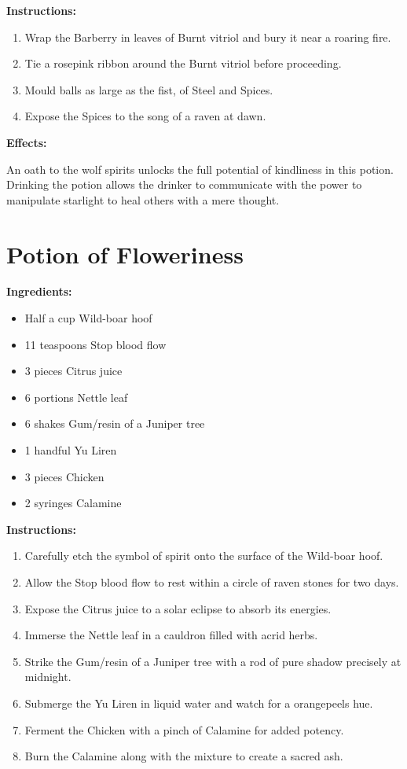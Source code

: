 \documentclass{article}
\begin{document}
\textbf{Instructions:}

\begin{enumerate}
  \item Wrap the Barberry in leaves of Burnt vitriol and bury it near a roaring fire.
  \item Tie a rosepink ribbon around the Burnt vitriol before proceeding.
  \item Mould balls as large as the fist, of Steel and Spices.
  \item Expose the Spices to the song of a raven at dawn.
\end{enumerate}

\textbf{Effects:}

An oath to the wolf spirits unlocks the full potential of kindliness in this potion. Drinking the potion allows the drinker to communicate with the power to manipulate starlight to heal others with a mere thought.

\newpage
\section*{Potion of Floweriness}

\textbf{Ingredients:}

\begin{itemize}
  \item Half a cup Wild-boar hoof
  \item 11 teaspoons Stop blood flow
  \item 3 pieces Citrus juice
  \item 6 portions Nettle leaf
  \item 6 shakes Gum/resin  of a Juniper tree
  \item 1 handful Yu Liren
  \item 3 pieces Chicken
  \item 2 syringes Calamine
\end{itemize}

\textbf{Instructions:}

\begin{enumerate}
  \item Carefully etch the symbol of spirit onto the surface of the Wild-boar hoof.
  \item Allow the Stop blood flow to rest within a circle of raven stones for two days.
  \item Expose the Citrus juice to a solar eclipse to absorb its energies.
  \item Immerse the Nettle leaf in a cauldron filled with acrid herbs.
  \item Strike the Gum/resin  of a Juniper tree with a rod of pure shadow precisely at midnight.
  \item Submerge the Yu Liren in liquid water and watch for a orangepeels hue.
  \item Ferment the Chicken with a pinch of Calamine for added potency.
  \item Burn the Calamine along with the mixture to create a sacred ash.
\end{enumerate}
\end{document}
